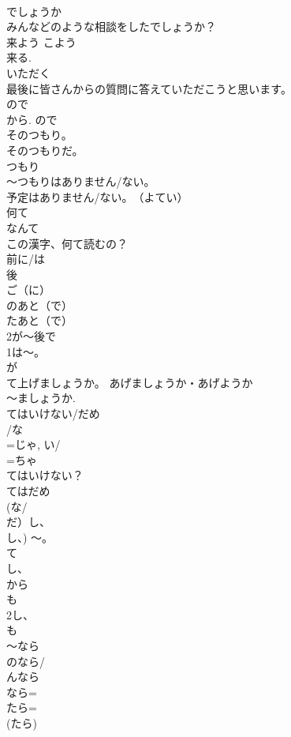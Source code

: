 \documentclass[8pt]{extreport}
\begin{document}
\begin{CJK}{UTF8}{min}
\\	でしょうか 
\\	みんなどのような相談をしたでしょうか？
\\	来よう	こよう 
\\	来る. 
\\	いただく 
\\	最後に皆さんからの質問に答えていただこうと思います。 
\\	ので
\\	から. ので 
\\	そのつもり。	
\\	そのつもりだ。 
\\	つもり 
\\	～つもりはありません/ない。 
\\	予定はありません/ない。　（よてい）
\\	何て	
\\	なんて 
\\	この漢字、何て読むの？
\\	前に/は	
\\	後	
\\	ご（に） 
\\	のあと（で） 
\\	たあと（で） 
\\	2が～後で
\\	1は～。 
\\	が 
\\	て上げましょうか。	あげましょうか・あげようか 
\\	～ましょうか. 
\\	てはいけない/だめ	
\\	/な
\\	=じゃ, い/
\\	=ちゃ 
\\	てはいけない？ 
\\	てはだめ 
\\	(な/
\\	だ）し、
\\	し、) ～。	
\\	て
\\	し、
\\	から
\\	も
\\	2し、
\\	も 
\\	～なら	
\\	のなら/
\\	んなら 
\\	なら= 
\\	たら= 
\\	(たら) 

\end{CJK}
\end{document}
